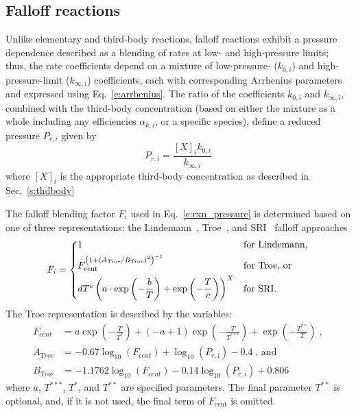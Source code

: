 \documentclass[12pt]{article}
\begin{document}
\subsection{Falloff reactions}
Unlike elementary and third-body reactions, falloff reactions exhibit a pressure dependence described as a blending of rates at low- and high-pressure limits; thus, the rate coefficients depend on a mixture of low-pressure- ($k_{0, i}$) and high-pressure-limit ($k_{\infty,i}$) coefficients, each with corresponding Arrhenius parameters and expressed using Eq.~\eqref{e:arrhenius}.
The ratio of the coefficients $k_{0, i}$ and $k_{\infty, i}$, combined with the third-body concentration (based on either the mixture as a whole including any efficiencies $\alpha_{k,i}$, or a specific species), define a reduced pressure $P_{r,i}$ given by
\begin{equation}
 P_{r, i}=\frac{[X]_{i} k_{0, i}}{k_{\infty, i}}
\end{equation}
where $[X]_{i}$ is the appropriate third-body concentration as described in Sec.~\ref{s:thdbody}

The falloff blending factor $F_i$ used in Eq.~\eqref{e:rxn_pressure} is determined based on one of three representations: the Lindemann~\cite{Lindemann:1922cz}, Troe~\cite{Gilbert:1983bb}, and SRI~\cite{Stewart:1989gj} falloff approaches
\begin{equation}
F_i = \begin{dcases}
1 &\text{for Lindemann,} \\
F_{\text{cent}}^{ \left( 1 + ( A_{\text{Troe}} / B_{\text{Troe}} )^2 \right)^{-1} } &\text{for Troe, or} \\
d T^e \left( a \cdot \exp \left( -\frac{b}{T} \right) + \exp \left( -\frac{T}{c} \right) \right)^X &\text{for SRI.}
\end{dcases}
\end{equation}
The Troe representation is described by the variables:
\begin{align}
 F_{cent} &= a \operatorname{exp}\left({- \frac{T}{T^{*}}}\right) + \left(- a + 1\right) \operatorname{exp}\left({- \frac{T}{T^{***}}}\right) + \operatorname{exp}\left({- \frac{T^{**}}{T}}\right) \;, \\ 
 A_{Troe} &= - 0.67 \log_{10}{\left (F_{cent} \right )} + \log_{10}{\left (P_{r, i} \right )} - 0.4 \;\text{, and}\\
 B_{Troe} &= - 1.1762 \log_{10}{\left (F_{cent} \right )} - 0.14 \log_{10}{\left (P_{r, i} \right )} + 0.806 
\end{align}
where $a$, $T^{***}$, $T^*$, and $T^{**}$ are specified parameters.
The final parameter $T^{**}$ is optional, and, if it is not used, the final term of $F_{\text{cent}}$ is omitted.
\end{document}
